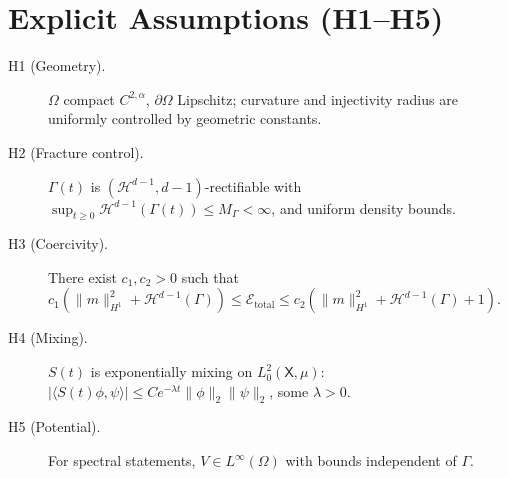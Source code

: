 \section*{Explicit Assumptions (H1–H5)}
\begin{description}
\item[H1 (Geometry).] $\Omega$ compact $C^{2,\alpha}$, $\partial\Omega$ Lipschitz; curvature and injectivity radius are uniformly controlled by geometric constants.
\item[H2 (Fracture control).] $\Gamma(t)$ is $(\mathcal{H}^{d-1},d-1)$-rectifiable with
$\sup_{t\ge 0}\mathcal{H}^{d-1}(\Gamma(t))\le M_\Gamma<\infty$, and uniform density bounds.
\item[H3 (Coercivity).] There exist $c_1,c_2>0$ such that
$c_1(\|m\|_{H^1}^2+\mathcal{H}^{d-1}(\Gamma))\le \mathcal{E}_{\mathrm{total}}
\le c_2(\|m\|_{H^1}^2+\mathcal{H}^{d-1}(\Gamma)+1)$.
\item[H4 (Mixing).] $S(t)$ is exponentially mixing on $L^2_0(\mathsf{X},\mu)$:
$|\langle S(t)\phi,\psi\rangle|\le C e^{-\lambda t}\|\phi\|_2\|\psi\|_2$, some $\lambda>0$.
\item[H5 (Potential).] For spectral statements, $V\in L^\infty(\Omega)$ with bounds independent of $\Gamma$.
\end{description}

